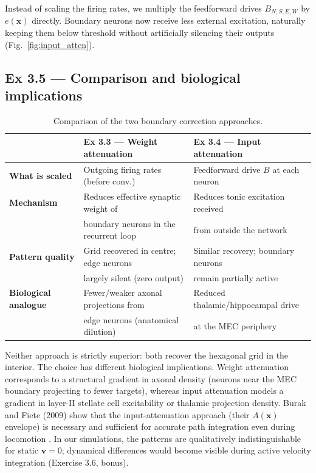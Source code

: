 \documentclass[11pt, a4paper]{article}
\begin{document}
Instead of scaling the firing rates, we multiply the feedforward drives $B_{N,S,E,W}$ by
$e(\mathbf{x})$ directly. Boundary neurons now receive less external excitation, naturally keeping
them below threshold without artificially silencing their outputs (Fig.~\ref{fig:input_atten}).

\subsection{Ex 3.5 --- Comparison and biological implications}

\begin{table}[H]
    \centering
    \caption{Comparison of the two boundary correction approaches.}
    \label{tab:approaches}
    \begin{tabular}{@{}lll@{}}
        \toprule
        & \textbf{Ex 3.3 — Weight attenuation} & \textbf{Ex 3.4 — Input attenuation} \\
        \midrule
        \textbf{What is scaled} & Outgoing firing rates (before conv.) & Feedforward drive $B$ at each neuron \\
        \textbf{Mechanism} & Reduces effective synaptic weight of & Reduces tonic excitation received \\
                           & boundary neurons in the recurrent loop & from outside the network \\
        \textbf{Pattern quality} & Grid recovered in centre; edge neurons & Similar recovery; boundary neurons \\
                                 & largely silent (zero output) & remain partially active \\
        \textbf{Biological analogue} & Fewer/weaker axonal projections from & Reduced thalamic/hippocampal drive \\
                                     & edge neurons (anatomical dilution) & at the MEC periphery \\
        \bottomrule
    \end{tabular}
\end{table}

Neither approach is strictly superior: both recover the hexagonal grid in the interior.
The choice has different biological implications. Weight attenuation corresponds to a structural
gradient in axonal density (neurons near the MEC boundary projecting to fewer targets), whereas
input attenuation models a gradient in layer-II stellate cell excitability or thalamic projection
density. Burak and Fiete (2009) show that the input-attenuation approach (their $A(\mathbf{x})$
envelope) is necessary and sufficient for accurate path integration even during locomotion
\cite{burak2009}. In our simulations, the patterns are qualitatively indistinguishable for
static $\mathbf{v}=0$; dynamical differences would become visible during active velocity
integration (Exercise 3.6, bonus).
\end{document}
